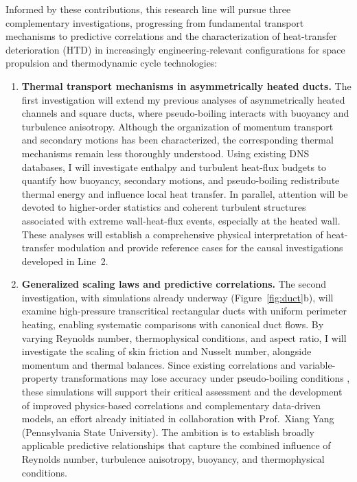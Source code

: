 \documentclass[11pt]{article}
\begin{document}
Informed by these contributions, this research line will pursue three complementary investigations, progressing from fundamental transport mechanisms to predictive correlations and the characterization of heat-transfer deterioration (HTD) in increasingly engineering-relevant configurations for space propulsion and thermodynamic cycle technologies:
\begin{enumerate}
	\item \textbf{Thermal transport mechanisms in asymmetrically heated ducts.}
	The first investigation will extend my previous analyses of asymmetrically heated channels and square ducts, where pseudo-boiling interacts with buoyancy and turbulence anisotropy.
	Although the organization of momentum transport and secondary motions has been characterized, the corresponding thermal mechanisms remain less thoroughly understood.
	Using existing DNS databases, I will investigate enthalpy and turbulent heat-flux budgets to quantify how buoyancy, secondary motions, and pseudo-boiling redistribute thermal energy and influence local heat transfer.
	In parallel, attention will be devoted to higher-order statistics and coherent turbulent structures associated with extreme wall-heat-flux events, especially at the heated wall.
	These analyses will establish a comprehensive physical interpretation of heat-transfer modulation and provide reference cases for the causal investigations developed in Line~2.
	
	\item \textbf{Generalized scaling laws and predictive correlations.}
	The second investigation, with simulations already underway (Figure~\ref{fig:duct}b), will examine high-pressure transcritical rectangular ducts with uniform perimeter heating, enabling systematic comparisons with canonical duct flows.
	By varying Reynolds number, thermophysical conditions, and aspect ratio, I will investigate the scaling of skin friction and Nusselt number, alongside momentum and thermal balances.
	Since existing correlations and variable-property transformations may lose accuracy under pseudo-boiling conditions \cite{Modesti2026,Li2025}, these simulations will support their critical assessment and the development of improved physics-based correlations and complementary data-driven models, an effort already initiated in collaboration with Prof.~Xiang Yang (Pennsylvania State University).
	The ambition is to establish broadly applicable predictive relationships that capture the combined influence of Reynolds number, turbulence anisotropy, buoyancy, and thermophysical conditions.
	

\end{enumerate}
\end{document}
